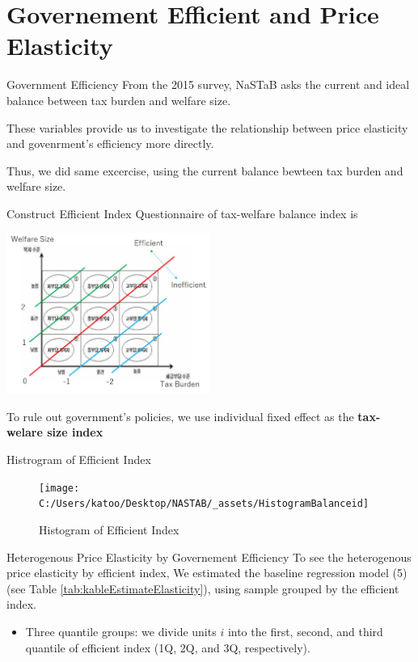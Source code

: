 \documentclass[
  ignorenonframetext,
]{beamer}
\providecommand{\tightlist}{%
  \setlength{\itemsep}{0pt}\setlength{\parskip}{0pt}}
\begin{document}
\hypertarget{governement-efficient-and-price-elasticity}{%
\section{Governement Efficient and Price
Elasticity}\label{governement-efficient-and-price-elasticity}}

\begin{frame}{Government Efficiency}
\protect\hypertarget{government-efficiency}{}
From the 2015 survey, NaSTaB asks the current and ideal balance between
tax burden and welfare size.

These variables provide us to investigate the relationship between price
elasticity and govenrment's efficiency more directly.

Thus, we did same excercise, using the current balance bewteen tax
burden and welfare size.
\end{frame}

\begin{frame}{Construct Efficient Index}
\protect\hypertarget{construct-efficient-index}{}
Questionnaire of tax-welfare balance index is

\includegraphics[width=0.5\textwidth,height=\textheight]{_assets/BalanceQuestion.jpg}

To rule out government's policies, we use individual fixed effect as the
\textbf{tax-welare size index}
\end{frame}

\begin{frame}{Histrogram of Efficient Index}
\protect\hypertarget{histrogram-of-efficient-index}{}
\begin{figure}
\texttt{[image: C:/Users/katoo/Desktop/NASTAB/\_assets/HistogramBalanceid]} \caption{Histogram of Efficient Index}\label{fig:unnamed-chunk-10}
\end{figure}
\end{frame}

\begin{frame}{Heterogenous Price Elasticity by Governement Efficiency}
\protect\hypertarget{heterogenous-price-elasticity-by-governement-efficiency}{}
To see the heterogenous price elasticity by efficient index, We
estimated the baseline regression model (5) (see Table
\ref{tab:kableEstimateElasticity}), using sample grouped by the
efficient index.

\begin{itemize}
\tightlist
\item
  Three quantile groups: we divide units \(i\) into the first, second,
  and third quantile of efficient index (1Q, 2Q, and 3Q, respectively).
\end{itemize}
\end{frame}
\end{document}
